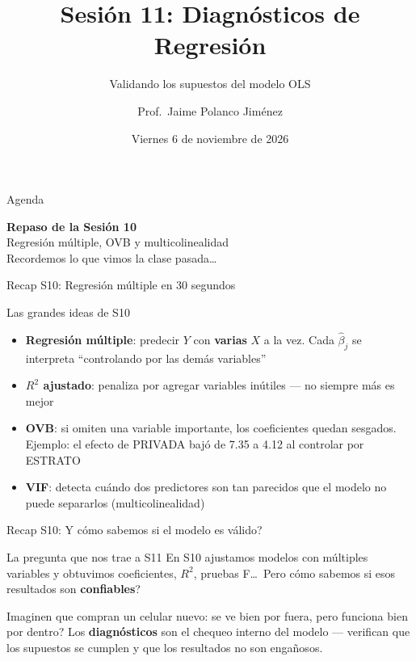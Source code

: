 \documentclass[aspectratio=169, 11pt]{beamer}
\title{Sesión 11: Diagnósticos de Regresión}
\subtitle{Validando los supuestos del modelo OLS}
\author{Prof.\ Jaime Polanco Jim\'enez}
\date{Viernes 6 de noviembre de 2026}
\begin{document}
\begin{frame}
\titlepage
\end{frame}

\begin{frame}{Agenda}
\tableofcontents
\end{frame}

\begin{frame}{}
\vfill
\centering
{\Large\textbf{Repaso de la Sesi\'on 10}}\\[1em]
{\normalsize Regresi\'on m\'ultiple, OVB y multicolinealidad}\\[0.5em]
{\small Recordemos lo que vimos la clase pasada\ldots}
\vfill
\end{frame}

\begin{frame}{Recap S10: Regresi\'on m\'ultiple en 30 segundos}
\begin{exampleblock}{Las grandes ideas de S10}
\small
\begin{itemize}\setlength{\itemsep}{2pt}
  \item \textbf{Regresi\'on m\'ultiple}: predecir $Y$ con \textbf{varias} $X$ a la vez. Cada $\hat{\beta}_j$ se interpreta ``controlando por las dem\'as variables''
  \item \textbf{$R^2$ ajustado}: penaliza por agregar variables in\'utiles --- no siempre m\'as es mejor
  \item \textbf{OVB}: si omiten una variable importante, los coeficientes quedan sesgados. Ejemplo: el efecto de PRIVADA baj\'o de 7.35 a 4.12 al controlar por ESTRATO
  \item \textbf{VIF}: detecta cu\'ando dos predictores son tan parecidos que el modelo no puede separarlos (multicolinealidad)
\end{itemize}
\end{exampleblock}
\end{frame}

\begin{frame}{Recap S10: \textquestiondown{}Y c\'omo sabemos si el modelo es v\'alido?}
\begin{alertblock}{La pregunta que nos trae a S11}
\small
En S10 ajustamos modelos con m\'ultiples variables y obtuvimos coeficientes, $R^2$, pruebas F\ldots\ Pero \textquestiondown{}c\'omo sabemos si esos resultados son \textbf{confiables}?

\vspace{0.2cm}
Imaginen que compran un celular nuevo: se ve bien por fuera, pero \textquestiondown{}funciona bien por dentro? Los \textbf{diagn\'osticos} son el chequeo interno del modelo --- verifican que los supuestos se cumplen y que los resultados no son enga\~nosos.
\end{alertblock}
\end{frame}
\end{document}
